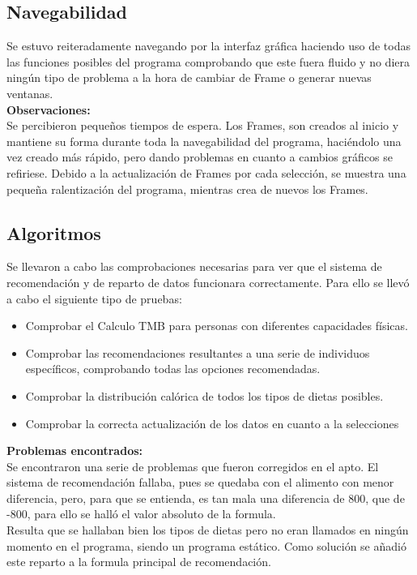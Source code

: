 \subsection{Navegabilidad}
Se estuvo reiteradamente navegando por la interfaz gráfica haciendo uso de todas las funciones posibles del programa comprobando que este fuera fluido y no diera ningún tipo de problema a la hora de cambiar de Frame o generar nuevas ventanas.\\
\textbf{Observaciones:}\\
Se percibieron pequeños tiempos de espera. Los Frames, son creados al inicio y mantiene su forma durante toda la navegabilidad del programa, haciéndolo una vez creado más rápido, pero dando problemas en cuanto a cambios gráficos se refiriese. Debido a la actualización de Frames por cada selección, se muestra una pequeña ralentización del programa, mientras crea de nuevos los Frames.
\subsection{Algoritmos}
Se llevaron a cabo las comprobaciones necesarias para ver que el sistema de recomendación y de reparto de datos funcionara correctamente. Para ello se llevó a cabo el siguiente tipo de pruebas:
\begin{itemize}
\item Comprobar el Calculo TMB para personas con diferentes capacidades físicas.
\item Comprobar las recomendaciones resultantes a una serie de individuos específicos, comprobando todas las opciones recomendadas.
\item Comprobar la distribución calórica de todos los tipos de dietas posibles.
\item Comprobar la correcta actualización de los datos en cuanto a la selecciones
\end{itemize}
\textbf{Problemas encontrados:}\\
Se encontraron una serie de problemas que fueron corregidos en el apto. El sistema de recomendación fallaba, pues se quedaba con el alimento con menor diferencia, pero, para que se entienda, es tan mala una diferencia de 800, que de -800, para ello se halló el valor absoluto de la formula.\\
Resulta que se hallaban bien los tipos de dietas pero no eran llamados en ningún momento en el programa, siendo un programa estático. Como solución se añadió este reparto a la formula principal de recomendación.
